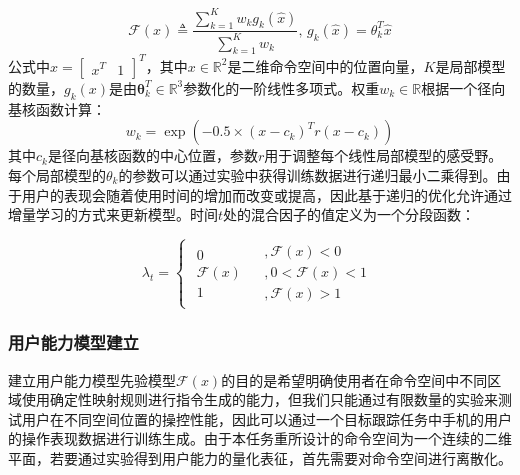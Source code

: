 \begin{equation}
    \label{ex7}
    \mathcal{F} (x) \triangleq \frac{{\sum\nolimits_{k = 1}^K {{w_k}{g_k}(\hat x)} }}{{\sum\nolimits_{k = 1}^K {{w_k}} }}{\text{,  }}{g_k}(\hat x) = {\theta}_k^T{\hat x}
\end{equation}   
公式中$\hat x = {[\begin{array}{*{20}{c}}{{x^T}}&1\end{array}]^T}$，其中${x} \in {\mathbb{R}^2}$是二维命令空间中的位置向量，$K$是局部模型的数量，${g_k}(x)$是由${\boldsymbol{\theta }}_k^T \in {\mathbb{R}^{3}}$参数化的一阶线性多项式。权重${w_k\in {\mathbb{R}}}$根据一个径向基核函数计算：
\begin{equation}
    \label{ex8}
    {w_k} = \exp \left( { - 0.5 \times {{(x - {{c}_k})}^T}{{r}}(x - {c_k})} \right)
\end{equation}
其中$c_k$是径向基核函数的中心位置，参数$r$用于调整每个线性局部模型的感受野。每个局部模型的${\theta }_k$的参数可以通过实验中获得训练数据进行递归最小二乘得到。由于用户的表现会随着使用时间的增加而改变或提高，因此基于递归的优化允许通过增量学习的方式来更新模型。时间$t$处的混合因子的值定义为一个分段函数：

\begin{equation}
    \label{ex9}
    {\lambda _t} = \left \{  {\begin{array}{*{20}{c}}
        {\begin{array}{*{20}{c}}
        0  \\  
        {\mathcal{F} (x)}  \\  
        1 
      \end{array}}&{\begin{array}{*{20}{c}}
        {,\mathcal{F} (x) < 0}  \\  
        {,0 < \mathcal{F} (x) < 1}  \\  
        {,\mathcal{F} (x) > 1} 
      \end{array}} 
      \end{array}} \right.
\end{equation}     

\subsubsection{用户能力模型建立}建立用户能力模型先验模型$\mathcal{F}(x)$的目的是希望明确使用者在命令空间中不同区域使用确定性映射规则进行指令生成的能力，但我们只能通过有限数量的实验来测试用户在不同空间位置的操控性能，因此可以通过一个目标跟踪任务中手机的用户的操作表现数据进行训练生成。由于本任务重所设计的命令空间为一个连续的二维平面，若要通过实验得到用户能力的量化表征，首先需要对命令空间进行离散化。  

